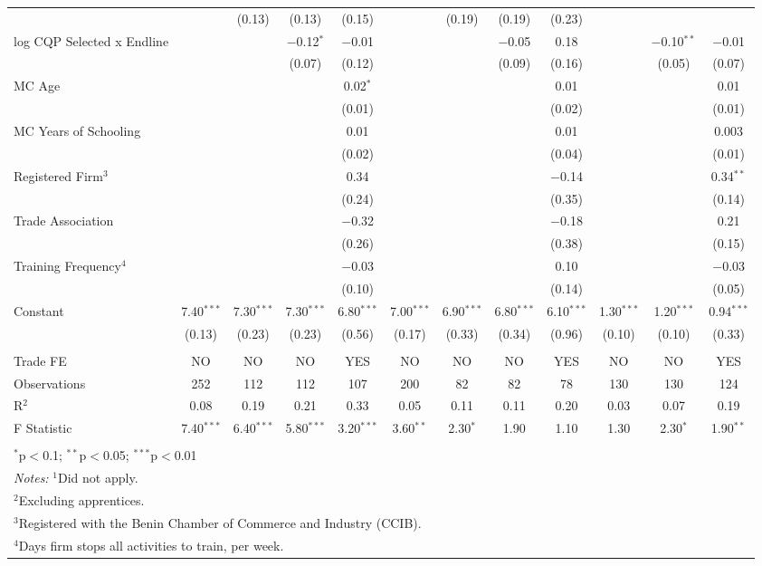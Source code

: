 \documentclass[
  a4paper, twoside, 12pt]{book}
\begin{document}
\begin{table}[H]
\begin{tabular}{@{\extracolsep{-8pt}}lccccccccccc}
  &  & (0.13) & (0.13) & (0.15) &  & (0.19) & (0.19) & (0.23) &  &  &  \\ 
  log CQP Selected x Endline &  &  & $-$0.12$^{*}$ & $-$0.01 &  &  & $-$0.05 & 0.18 &  & $-$0.10$^{**}$ & $-$0.01 \\ 
  &  &  & (0.07) & (0.12) &  &  & (0.09) & (0.16) &  & (0.05) & (0.07) \\ 
  MC Age &  &  &  & 0.02$^{*}$ &  &  &  & 0.01 &  &  & 0.01 \\ 
  &  &  &  & (0.01) &  &  &  & (0.02) &  &  & (0.01) \\ 
  MC Years of Schooling &  &  &  & 0.01 &  &  &  & 0.01 &  &  & 0.003 \\ 
  &  &  &  & (0.02) &  &  &  & (0.04) &  &  & (0.01) \\ 
  Registered Firm$^3$ &  &  &  & 0.34 &  &  &  & $-$0.14 &  &  & 0.34$^{**}$ \\ 
  &  &  &  & (0.24) &  &  &  & (0.35) &  &  & (0.14) \\ 
  Trade Association &  &  &  & $-$0.32 &  &  &  & $-$0.18 &  &  & 0.21 \\ 
  &  &  &  & (0.26) &  &  &  & (0.38) &  &  & (0.15) \\ 
  Training Frequency$^4$ &  &  &  & $-$0.03 &  &  &  & 0.10 &  &  & $-$0.03 \\ 
  &  &  &  & (0.10) &  &  &  & (0.14) &  &  & (0.05) \\ 
  Constant & 7.40$^{***}$ & 7.30$^{***}$ & 7.30$^{***}$ & 6.80$^{***}$ & 7.00$^{***}$ & 6.90$^{***}$ & 6.80$^{***}$ & 6.10$^{***}$ & 1.30$^{***}$ & 1.20$^{***}$ & 0.94$^{***}$ \\ 
  & (0.13) & (0.23) & (0.23) & (0.56) & (0.17) & (0.33) & (0.34) & (0.96) & (0.10) & (0.10) & (0.33) \\ 
 \hline \\[-1.8ex] 
Trade FE & NO & NO & NO & YES & NO & NO & NO & YES & NO & NO & YES \\ 
Observations & 252 & 112 & 112 & 107 & 200 & 82 & 82 & 78 & 130 & 130 & 124 \\ 
R$^{2}$ & 0.08 & 0.19 & 0.21 & 0.33 & 0.05 & 0.11 & 0.11 & 0.20 & 0.03 & 0.07 & 0.19 \\ 
F Statistic & 7.40$^{***}$ & 6.40$^{***}$ & 5.80$^{***}$ & 3.20$^{***}$ & 3.60$^{**}$ & 2.30$^{*}$ & 1.90 & 1.10 & 1.30 & 2.30$^{*}$ & 1.90$^{**}$ \\ 
\hline 
\hline \\[-1.8ex] 
\multicolumn{12}{l}{$^{*}$p$<$0.1; $^{**}$p$<$0.05; $^{***}$p$<$0.01} \\ 
\multicolumn{12}{l}{\textit{Notes:} $^1$Did not apply.} \\ 
\multicolumn{12}{l}{$^2$Excluding apprentices.} \\ 
\multicolumn{12}{l}{$^3$Registered with the Benin Chamber of Commerce and Industry (CCIB).} \\ 
\multicolumn{12}{l}{$^4$Days firm stops all activities to train, per week.} \\ 
\end{tabular} 
\end{table}
\end{document}
